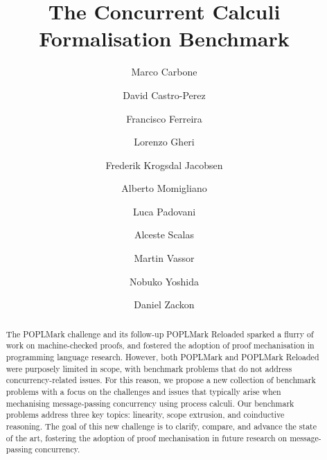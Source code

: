 \documentclass[runningheads]{llncs}
\begin{document}
\title{The Concurrent Calculi Formalisation Benchmark}

\author{
     Marco Carbone 
\and David Castro-Perez 
\and Francisco Ferreira 
\and Lorenzo Gheri 
\and Frederik Krogsdal Jacobsen 
\and Alberto Momigliano 
\and Luca Padovani 
\and Alceste Scalas 
\and Martin Vassor 
\and Nobuko Yoshida 
\and Daniel Zackon 
}



\maketitle

\begin{abstract}
  The POPLMark challenge and its follow-up POPLMark Reloaded sparked a flurry of
  work on machine-checked proofs, and fostered the adoption of proof
  mechanisation in programming language research.  However, both POPLMark and
  POPLMark Reloaded were purposely limited in scope, with benchmark problems
  that do not address concurrency-related issues.
  For this reason, we propose a new collection of benchmark problems with a
  focus on the challenges and issues that typically arise when mechanising
  message-passing concurrency using process calculi.  Our benchmark problems
  address three key topics: linearity, scope extrusion, and coinductive
  reasoning.  The goal of this new challenge is to clarify, compare, and advance
  the state of the art, fostering the adoption of proof mechanisation in future
  research on message-passing concurrency.

\end{abstract}
\end{document}

